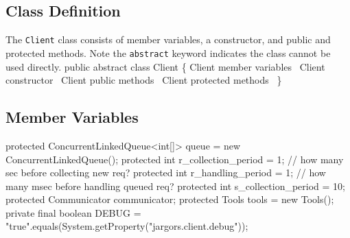 \subsection{Class Definition}
The {\tt{}Client} class consists of member variables, a constructor, and
public and protected methods. Note the {\tt{}abstract} keyword indicates the class
cannot be used directly.
\nwenddocs{}\endmoddef{}
public abstract class Client \{
  \LA{}\code{}Client\edoc{} member variables~{\nwtagstyle{}}\RA{}
  \LA{}\code{}Client\edoc{} constructor~{\nwtagstyle{}}\RA{}
  \LA{}\code{}Client\edoc{} public methods~{\nwtagstyle{}}\RA{}
  \LA{}\code{}Client\edoc{} protected methods~{\nwtagstyle{}}\RA{}
\}
\nwendcode{}\nwdocspar

\subsection{Member Variables}
\nwenddocs{}\endmoddef{}
protected ConcurrentLinkedQueue<int[]> queue = new ConcurrentLinkedQueue();
protected int r_collection_period = 1;  // how many sec before collecting new req?
protected int r_handling_period = 1;  // how many msec before handling queued req?
protected int s_collection_period = 10;
protected Communicator communicator;
protected Tools tools = new Tools();
private final boolean DEBUG = "true".equals(System.getProperty("jargors.client.debug"));
\eatline
{}\nwendcode{}\nwdocspar
